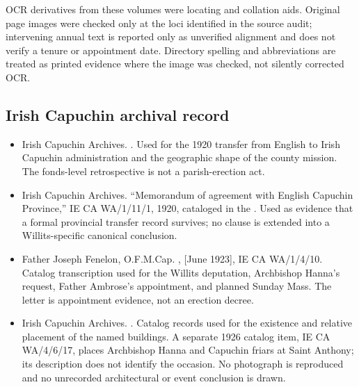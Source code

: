 OCR derivatives from these volumes were locating and collation aids. Original page images were checked only at the loci identified in the source audit; intervening annual text is reported only as unverified alignment and does not verify a tenure or appointment date. Directory spelling and abbreviations are treated as printed evidence where the image was checked, not silently corrected OCR.

\subsection{Irish Capuchin archival record}

\begin{itemize}[leftmargin=1.35em,itemsep=0.2em,topsep=0.2em]
\item Irish Capuchin Archives. . Used for the 1920 transfer from English to Irish Capuchin administration and the geographic shape of the county mission. The fonds-level retrospective is not a parish-erection act.
\item Irish Capuchin Archives. ``Memorandum of agreement with English Capuchin Province,'' IE CA WA/1/11/1, 1920, cataloged in the . Used as evidence that a formal provincial transfer record survives; no clause is extended into a Willits-specific canonical conclusion.
\item Father Joseph Fenelon, O.F.M.Cap. , [June 1923], IE CA WA/1/4/10. Catalog transcription used for the Willits deputation, Archbishop Hanna's request, Father Ambrose's appointment, and planned Sunday Mass. The letter is appointment evidence, not an erection decree.
\item Irish Capuchin Archives. . Catalog records used for the existence and relative placement of the named buildings. A separate 1926 catalog item, IE CA WA/4/6/17, places Archbishop Hanna and Capuchin friars at Saint Anthony; its description does not identify the occasion. No photograph is reproduced and no unrecorded architectural or event conclusion is drawn.

\end{itemize}
